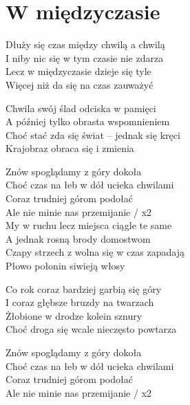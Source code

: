 \section{W międzyczasie}
\begin{text}
Dłuży się czas między chwilą a chwilą\\
I niby nic się w tym czasie nie zdarza\\
Lecz w międzyczasie dzieje się tyle\\
Więcej niż da się na czas zauważyć

Chwila swój ślad odciska w pamięci\\
A później tylko obrasta wspomnieniem\\
Choć stać zda się świat – jednak się kręci\\
Krajobraz obraca się i zmienia

Znów spoglądamy z góry dokoła\\
Choć czas na łeb w dół ucieka chwilami\\
Coraz trudniej górom podołać\\
Ale nie minie nas przemijanie / x2\\

My w ruchu lecz miejsca ciągle te same\\
A jednak rosną brody domostwom\\
Czapy strzech z wolna się w czas zapadają\\
Płowo połonin siwieją włosy

Co rok coraz bardziej garbią się góry\\
I coraz głębsze bruzdy na twarzach\\
Żłobione w drodze kolein sznury\\
Choć droga się wcale nieczęsto powtarza

Znów spoglądamy z góry dokoła\\
Choć czas na łeb w dół ucieka chwilami\\
Coraz trudniej górom podołać\\
Ale nie minie nas przemijanie / x2
\end{text}